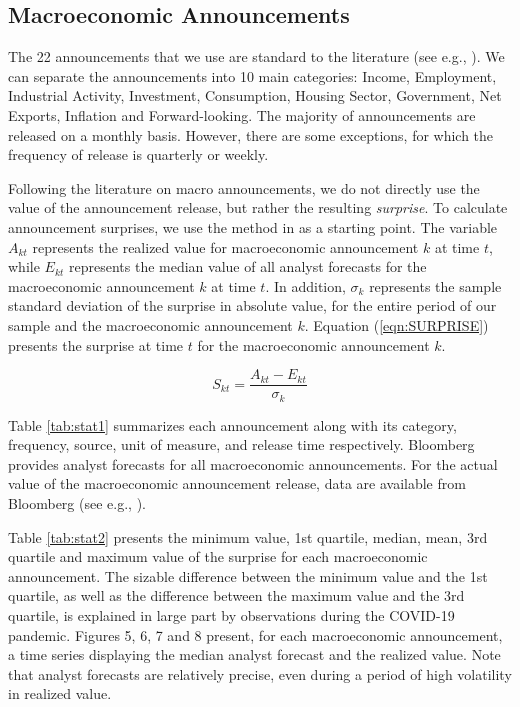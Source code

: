 \documentclass[12pt]{article}
\begin{document}
\subsection{Macroeconomic Announcements}
 
The 22  announcements that we use are standard to the literature (see e.g.,  \citep{kurov2019price}). We can separate the announcements into 10 main categories: Income, Employment, Industrial Activity, Investment, Consumption, Housing Sector, Government, Net Exports, Inflation and Forward-looking. The majority of announcements are released on a monthly basis. However, there are some exceptions, for which the frequency of release is quarterly or weekly.

Following the literature on macro announcements, we do not directly use the value of the announcement release, but rather the resulting \emph{surprise}. To calculate announcement surprises, we use the method in \citet{balduzzi2001economic} as a starting point. The variable $A_{kt}$ represents the realized value for macroeconomic announcement $k$ at time $t$, while $E_{kt}$ represents the median value of all analyst forecasts for the macroeconomic announcement $k$ at time $t$. In addition, $\sigma_k$ represents the sample standard deviation of the surprise in absolute value, for the entire period of our sample and the macroeconomic announcement $k$. Equation (\ref{eqn:SURPRISE}) presents the surprise at time $t$ for the macroeconomic announcement $k$.

\begin{equation}\label{eqn:SURPRISE}
S_{kt}=\frac{A_{kt}-E_{kt}}{\sigma_k}
\end{equation}

Table \ref{tab:stat1} summarizes each announcement along with its category, frequency, source, unit of measure, and release time respectively. Bloomberg provides analyst forecasts for all macroeconomic announcements. For the actual value of the macroeconomic announcement release, data are available from Bloomberg (see e.g., \citep{kurov2019price}). 

Table \ref{tab:stat2} presents the minimum value, 1st quartile, median, mean, 3rd quartile and maximum value of the surprise for each macroeconomic announcement. The sizable difference between the minimum value and the 1st quartile, as well as the difference between the maximum value and the 3rd quartile, is explained in large part by observations during the COVID-19 pandemic. Figures 5, 6, 7 and 8 present, for each macroeconomic announcement, a time series displaying the median analyst forecast and the realized value. Note that analyst forecasts are relatively precise, even during a period of high volatility in realized value.
\end{document}
